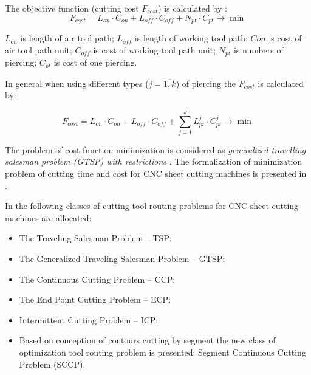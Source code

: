 \documentclass[runningheads]{llncs}
\begin{document}
The objective function
(cutting cost $F_{cost}$)
is calculated by \cite{ru04}:
\begin{equation}
F_{cost} =
L_{on} \cdot C_{on} +
L_{off} \cdot C_{off} +
N_{pt} \cdot C_{pt}
\to \min
\label{cost}
\end{equation}

$L_{on}$ is length of air tool path;
$L_{off}$ is length of working tool path;
$C{on}$ is cost of air tool path unit;
$C_{off}$ is cost of working tool path unit;
$N_{pt}$ is numbers of piercing;
$C_{pt}$ is cost of one piercing.

In general when using different types ($j = \overline{1, k}$) of piercing
the $F_{cost}$ is calculated by:

\begin{equation}
  F_{cost} =
  L_{on} \cdot C_{on} +
  L_{off} \cdot C_{off} +
  \sum_{j=1}^k L_{pt}^j \cdot C_{pt}^j
  \to \min
  \label{cost-n}
\end{equation}

The problem of cost function minimization is considered as
\textit{generalized travelling salesman problem (GTSP) with restrictions}
\cite{ru04,ru05}.
The formalization of minimization problem of cutting time and cost
for CNC sheet cutting machines is presented in \cite{ru04}.

In \cite{Dewil2016Nov,Hoeft1997Sep,Petunin2015Nov}
the following classes of cutting tool routing problems
for CNC sheet cutting machines are allocated:

\begin{itemize}

\item The Traveling Salesman Problem – TSP;

\item The Generalized Traveling Salesman Problem – GTSP;

\item The Continuous Cutting Problem – CCP;

\item The End Point Cutting Problem – ECP;

\item Intermittent Cutting Problem – ICP;

\item Based on conception of contours cutting by segment \cite{Petunin2015Nov}
the new class of optimization tool routing problem is presented:
Segment Continuous Cutting Problem (SCCP).

\end{itemize}
\end{document}
